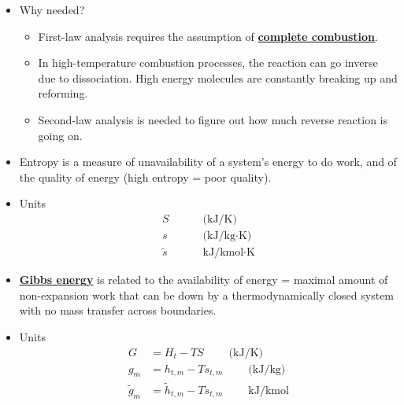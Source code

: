 \begin{itemize}
    \item Why needed?
    \begin{itemize}
        \item First-law analysis requires the assumption of \textbf{\ul{complete combustion}}.
        \item In high-temperature combustion processes, the reaction can go inverse due to dissociation. High energy molecules are constantly breaking up and reforming.
        \item Second-law analysis is needed to figure out how much reverse reaction is going on.
    \end{itemize}
    \item {\color{red}Entropy} is a measure of {\color{blue}unavailability of a system's energy to do work}, and of the {\color{brown}quality of energy (high entropy = poor quality)}.
    \item Units
    \begin{align*}
        S \; \qquad &\text{(kJ/K)} \\
        s \; \qquad &\text{(kJ/kg$\cdot$K)} \\
        \tilde{s} \; \qquad  &\text{kJ/kmol$\cdot$K}
    \end{align*}
    \item \textbf{\ul{Gibbs energy}} is related to the {\color{blue}availability of energy} = maximal amount of non-expansion work that can be down by a thermodynamically closed system with no mass transfer across boundaries.
    \item Units
    \begin{align*}
        G &= H_t - TS \; \qquad \text{(kJ/K)} \\
        g_m &= h_{t,m} - T s_{t,m} \; \qquad \text{(kJ/kg)} \\
        \tilde{g}_m &= \tilde{h}_{t,m} - T \tilde{s}_{t,m} \; \qquad  \text{kJ/kmol}
    \end{align*}
\end{itemize}

